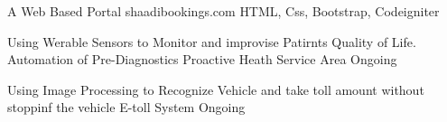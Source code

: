 

\begin{cventries}

  \cventry
    {A Web Based Portal} %
    {shaadibookings.com} %
    {HTML, Css, Bootstrap, Codeigniter} %
    {} %
    {
      \begin{cvitems} %
      \end{cvitems}
    }


	\cventry
    {Using Werable Sensors to Monitor and improvise Patirnts Quality of Life. Automation of Pre-Diagnostics} %
    {Proactive Heath Service Area} %
    {Ongoing} %
    {} %
    {
      \begin{cvitems} %
      \end{cvitems}
    }


	\cventry
    {Using Image Processing to Recognize Vehicle and take toll amount without stoppinf the vehicle} %
    {E-toll System} %
    {Ongoing} %
    {} %
    {
      \begin{cvitems} %
      \end{cvitems}
    }

\end{cventries}
